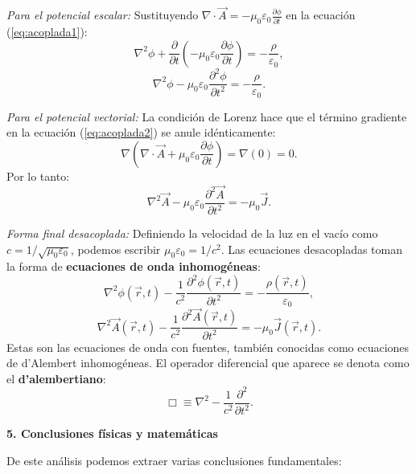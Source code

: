\documentclass[a4paper]{article}
\begin{document}
\noindent\textit{Para el potencial escalar:}
Sustituyendo $\nabla \cdot \vec{A} = -\mu_0\varepsilon_0 \frac{\partial \phi}{\partial t}$ en la ecuación (\ref{eq:acoplada1}):
$$
\nabla^2\phi + \frac{\partial}{\partial t}\left(-\mu_0\varepsilon_0 \frac{\partial \phi}{\partial t}\right) = -\frac{\rho}{\varepsilon_0},
$$
$$
\nabla^2\phi - \mu_0\varepsilon_0 \frac{\partial^2 \phi}{\partial t^2} = -\frac{\rho}{\varepsilon_0}.
$$

\noindent\textit{Para el potencial vectorial:}
La condición de Lorenz hace que el término gradiente en la ecuación (\ref{eq:acoplada2}) se anule idénticamente:
$$
\nabla\left(\nabla \cdot \vec{A} + \mu_0\varepsilon_0\frac{\partial \phi}{\partial t}\right) = \nabla(0) = 0.
$$
Por lo tanto:
$$
\nabla^2\vec{A} - \mu_0\varepsilon_0 \frac{\partial^2 \vec{A}}{\partial t^2} = -\mu_0 \vec{J}.
$$

\noindent\textit{Forma final desacoplada:}
Definiendo la velocidad de la luz en el vacío como $c = 1/\sqrt{\mu_0\varepsilon_0}$, podemos escribir $\mu_0\varepsilon_0 = 1/c^2$. Las ecuaciones desacopladas toman la forma de \textbf{ecuaciones de onda inhomogéneas}:
$$
\boxed{\nabla^2\phi(\vec{r},t) - \frac{1}{c^2}\frac{\partial^2 \phi(\vec{r},t)}{\partial t^2} = -\frac{\rho(\vec{r},t)}{\varepsilon_0}},
$$
$$
\boxed{\nabla^2\vec{A}(\vec{r},t) - \frac{1}{c^2}\frac{\partial^2 \vec{A}(\vec{r},t)}{\partial t^2} = -\mu_0\vec{J}(\vec{r},t)}.
$$
Estas son las ecuaciones de onda con fuentes, también conocidas como ecuaciones de d'Alembert inhomogéneas. El operador diferencial que aparece se denota como el \textbf{d'alembertiano}:
$$
\Box \equiv \nabla^2 - \frac{1}{c^2}\frac{\partial^2}{\partial t^2}.
$$

\vspace{0.3cm}
\noindent\textbf{5. Conclusiones físicas y matemáticas}

De este análisis podemos extraer varias conclusiones fundamentales:
\end{document}
